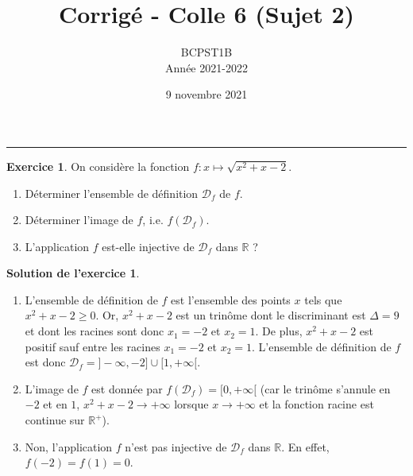 \documentclass[a4paper, 11pt,openany]{article}%
\title{Corrigé - Colle 6 (Sujet 2)}
\author{BCPST1B\\
Année 2021-2022}
\date{9 novembre 2021}
\theoremstyle{plain}
\theoremstyle{definition}
\newtheorem{exo}{Exercice}
\newtheorem{sol}{Solution de l'exercice}
\theoremstyle{remark}
\newcommand{\R}{\mathbb{R}}
\newcommand{\calD}{\mathcal{D}}
\begin{document}
   \maketitle
      \rule{\linewidth}{0.5mm}








\begin{exo}
On considère la fonction 
$ f : x \mapsto \sqrt{x^2 + x - 2}$.
\begin{enumerate}
\item Déterminer l'ensemble de définition $\calD_f$ de $f$.
\item Déterminer l'image de $f$, i.e. $f(\calD_f)$.
\item L'application $f$ est-elle injective de $\calD_f$ dans $\R$ ?
\end{enumerate}
\end{exo}

\begin{sol}
\begin{enumerate}
\item L'ensemble de définition de $f$ est l'ensemble des points $x$ tels que $x^2 + x -2 \geqslant 0$. Or, $x^2 + x -2$ est un trinôme dont le discriminant est $\Delta = 9$ et dont les racines sont donc $x_1 = -2$ et $x_2 =1$. De plus, $x^2 +x -2$ est positif sauf entre les racines $x_1 = -2$ et $x_2= 1$. L'ensemble de définition de $f$ est donc $\calD_f = ]-\infty,-2] \cup [1, +\infty[$.
\item L'image de $f$ est donnée par $f(\calD_f) = [0,+\infty[$ (car le trinôme s'annule en $-2$ et en $1$, $x^2+x-2 \to + \infty$ lorsque $x \to + \infty$ et la fonction racine est continue sur $\R^+$).
\item Non, l'application $f$ n'est pas injective de $\calD_f$ dans $\R$. En effet, $f(-2) =  f(1)= 0$.
\end{enumerate}
\end{sol}
\end{document}
